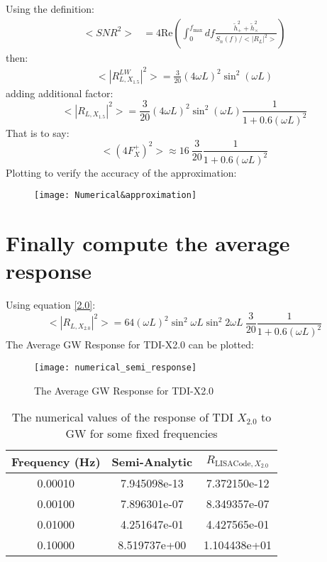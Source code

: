 \documentclass{article}
\begin{document}
	Using the definition:
	\begin{align}
		<SNR^2> &= 4\text{Re} \left( \int_{0}^{f_{\text{max}}} df \frac{\tilde{h}^2_{+} + \tilde{h}^2_{\times}}{S_n(f)/<\left|R_L\right|^2>} \right)
	\end{align}
	then:
	\begin{align}
		<\left| R^{LW}_{L,X_{1.5}} \right|^2> = \frac{3}{20} (4\omega L)^2 \sin^2(\omega L)
 	\end{align}
 	adding additional factor:
 	\begin{equation}
 		<\left| R_{L,X_{1.5}} \right|^2> = \frac{3}{20} (4\omega L)^2 \sin^2(\omega L) \frac{1}{1 + 0.6(\omega L)^2}
 	\end{equation}
 	That is to say:
 	\begin{equation}
 		<(4F^{+}_{X})^2> \approx 16 ~ \frac{3}{20} \frac{1}{1 + 0.6(\omega L)^2}
 	\end{equation}
 	Plotting to verify the accuracy of the approximation:
 	\begin{figure}[H]
 		\centering
 		\texttt{[image: Numerical\&approximation]}
 		\caption{}
 		\label{fig:numericalapproximation}
 	\end{figure}
 	
 	\section{Finally compute the average response}
 	Using equation \ref{2.0}:
 	\begin{equation}
 		<\left| R_{L,X_{2.0}} \right|^2> = 64 (\omega L)^2 \sin^2 \omega L \sin^2 2 \omega L ~ \frac{3}{20} \frac{1}{1 + 0.6(\omega L)^2}
 	\end{equation}
 	The Average GW Response for TDI-X2.0 can be plotted:
 	\begin{figure}[H]
 		\centering
 		\texttt{[image: numerical\_semi\_response]}
 		\caption{The Average GW Response for TDI-X2.0}
 		\label{fig:numericalsemiresponse}
 	\end{figure}
 	
 	\begin{table}[H]
 		\centering
 		\caption{The numerical values of the response of TDI $X_{2.0}$ to GW for some fixed frequencies}
	\begin{tabular}{|c|c|c|}
		\hline
	Frequency (Hz) & Semi-Analytic & $R_{\text{LISACode},X_{2.0}}$ \\
	\hline
	0.00010 & 7.945098e-13 & 7.372150e-12 \\
	\hline
	0.00100 & 7.896301e-07 & 8.349357e-07 \\
	\hline
	0.01000 & 4.251647e-01 & 4.427565e-01 \\
	\hline
	0.10000 & 8.519737e+00 & 1.104438e+01 \\
	\hline
	\end{tabular}
   \end{table}
   
\end{document}
